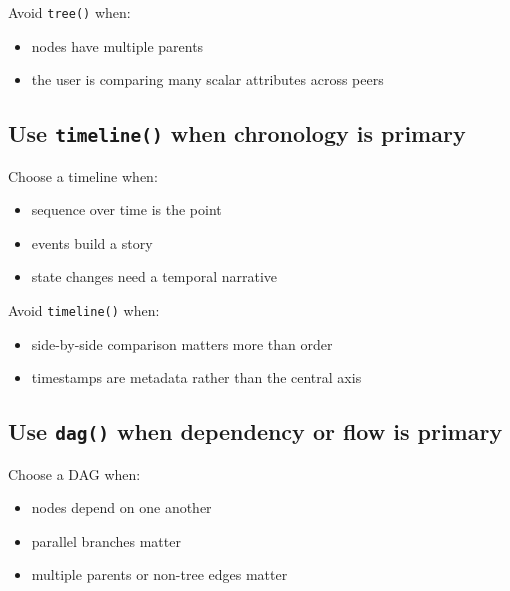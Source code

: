 Avoid \texttt{t\allowbreak{}r\allowbreak{}e\allowbreak{}e\allowbreak{}(\allowbreak{})} when:

\begin{itemize}
\tightlist
\item
  nodes have multiple parents
\item
  the user is comparing many scalar attributes across peers
\end{itemize}

\subsection{\texorpdfstring{Use \texttt{t\allowbreak{}i\allowbreak{}m\allowbreak{}e\allowbreak{}l\allowbreak{}i\allowbreak{}n\allowbreak{}e\allowbreak{}(\allowbreak{})} when chronology is primary}{Use  when chronology is primary}}\label{record-020-use-timeline-when-chronology-is-primary}

Choose a timeline when:

\begin{itemize}
\tightlist
\item
  sequence over time is the point
\item
  events build a story
\item
  state changes need a temporal narrative
\end{itemize}

Avoid \texttt{t\allowbreak{}i\allowbreak{}m\allowbreak{}e\allowbreak{}l\allowbreak{}i\allowbreak{}n\allowbreak{}e\allowbreak{}(\allowbreak{})} when:

\begin{itemize}
\tightlist
\item
  side-by-side comparison matters more than order
\item
  timestamps are metadata rather than the central axis
\end{itemize}

\subsection{\texorpdfstring{Use \texttt{d\allowbreak{}a\allowbreak{}g\allowbreak{}(\allowbreak{})} when dependency or flow is primary}{Use  when dependency or flow is primary}}\label{record-020-use-dag-when-dependency-or-flow-is-primary}

Choose a DAG when:

\begin{itemize}
\tightlist
\item
  nodes depend on one another
\item
  parallel branches matter
\item
  multiple parents or non-tree edges matter
\end{itemize}

